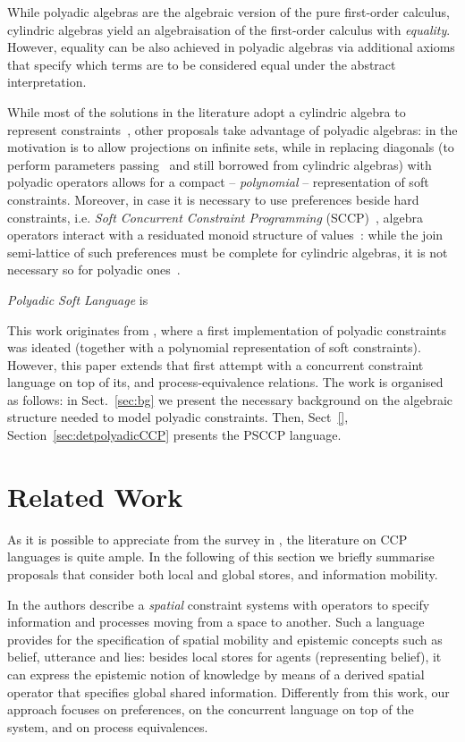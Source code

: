 \documentclass{llncs}
\begin{document}
While polyadic algebras are the algebraic version of the pure first-order calculus, cylindric algebras yield an algebraisation of the first-order calculus with \emph{equality}. However, equality can be also achieved in polyadic algebras via additional axioms that specify which terms are to be considered equal under the abstract interpretation.

 While most of the solutions in the literature adopt a cylindric algebra to represent constraints~\cite{popl91}, other proposals take advantage of polyadic algebras: in \cite{fgcs92} the motivation is to allow projections on infinite sets, while in  \cite{festcatuscia} replacing diagonals (to perform parameters passing~\cite{popl91} and still borrowed from cylindric algebras) with polyadic operators allows for a compact – \emph{polynomial} – representation of soft constraints.  Moreover, in case it is necessary to use preferences beside hard constraints, i.e. \emph{Soft Concurrent Constraint Programming} (SCCP)~\cite{jacm97,jlamp17}, algebra operators interact with a residuated monoid structure of values~\cite{ipl17}: while the join semi-lattice of such preferences must be complete for cylindric algebras,  it is not necessary so for polyadic ones~\cite{festcatuscia}.

\emph{Polyadic Soft Language} is 

This work originates from \cite{festcatuscia}, where a first implementation of polyadic constraints was ideated (together with a polynomial representation of soft constraints). However, this paper extends that first attempt with a concurrent constraint language on top of its, and process-equivalence relations.
The work is organised as  follows: in Sect.~\ref{sec:bg} we present the necessary background on the algebraic structure needed to model polyadic constraints. Then, Sect~\ref{}, 
Section~\ref{sec:detpolyadicCCP} presents the PSCCP language. 

\section{Related Work}\label{sec:related}
As it is possible to appreciate from the survey in \cite{emerging}, the literature on CCP languages is quite ample. In the following of this section  we briefly summarise proposals that consider both local and global stores, and information mobility.

In \cite{spatialvalencia} the authors describe a \emph{spatial} constraint systems with operators to
specify information and processes moving from a space to another. Such a language provides for the specification of spatial mobility and epistemic concepts such as belief, utterance and lies: besides local stores for agents  (representing belief), it can express the epistemic notion of knowledge by means of a derived spatial operator that specifies global shared information. Differently from this work, our approach focuses on preferences, on the concurrent language on top of the system, and on process equivalences.
\end{document}
